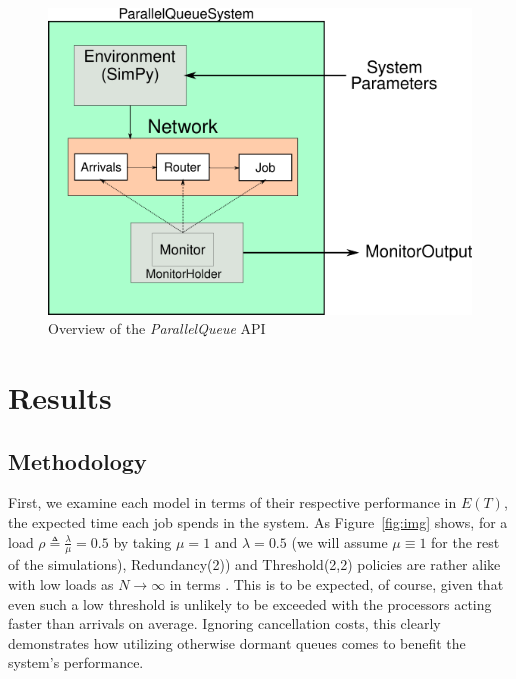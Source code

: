 \begin{figure}
    \centering
    \includegraphics[scale=0.7]{pq}
    \caption{Overview of the \textit{ParallelQueue} API}
    \label{fig:API}
\end{figure}


\section{Results}\label{sec:results}

\subsection{Methodology}\label{subsec:methodology}
First, we examine each model in terms of their respective performance in $E(T)$, the expected time each job spends in the system.
As Figure~\ref{fig:img} shows, for a load $\rho \triangleq \frac{\lambda}{\mu} = 0.5$ by taking $\mu=1$ and $\lambda = 0.5$ (we will assume $\mu \equiv 1$ for the
rest of the simulations), Redundancy(2)) and Threshold(2,2) policies are rather alike with low loads as $N \rightarrow \infty$ in terms .
This is to be expected, of course, given that even such a low threshold is unlikely to be exceeded with the processors acting faster than arrivals on average.
Ignoring cancellation costs, this clearly demonstrates how utilizing otherwise dormant queues comes to benefit the system's performance.


